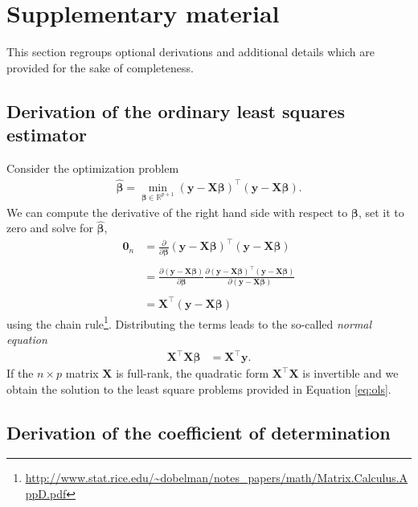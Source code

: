 \documentclass[
  11pt,
  letterpaper,
]{book}
\renewcommand{\href}[2]{#2\footnote{\url{#1}}}
\theoremstyle{definition}
\theoremstyle{definition}
\theoremstyle{definition}
\theoremstyle{definition}
\theoremstyle{remark}
\begin{document}
\hypertarget{math}{%
\chapter{Supplementary material}\label{math}}

This section regroups optional derivations and additional details which are provided for the sake of completeness.

\hypertarget{ols}{%
\section{Derivation of the ordinary least squares estimator}\label{ols}}

Consider the optimization problem
\begin{align*}
\widehat{\boldsymbol{\beta}}=\min_{\boldsymbol{\beta} \in \mathbb{R}^{p+1}}(\boldsymbol{y}-\mathbf{X}\boldsymbol{\beta})^\top(\boldsymbol{y}-\mathbf{X}\boldsymbol{\beta}).
\end{align*}
We can compute the derivative of the right hand side with respect to \(\boldsymbol{\beta}\), set it to zero and solve for \(\widehat{\boldsymbol{\beta}}\),
\begin{align*}
\mathbf{0}_n&=\frac{\partial}{\partial\boldsymbol{\beta}}(\boldsymbol{y}-\mathbf{X}\boldsymbol{\beta})^\top(\boldsymbol{y}-\mathbf{X}\boldsymbol{\beta})\\
\\&=\frac{\partial (\boldsymbol{y}-\mathbf{X}\boldsymbol{\beta})}{\partial \boldsymbol{\beta}}\frac{\partial (\boldsymbol{y}-\mathbf{X}\boldsymbol{\beta})^\top(\boldsymbol{y}-\mathbf{X}\boldsymbol{\beta})}{\partial (\boldsymbol{y}-\mathbf{X}\boldsymbol{\beta})}\\
 \\&=\mathbf{X}^\top (\boldsymbol{y}-\mathbf{X}\boldsymbol{\beta})
\end{align*}
using the \href{http://www.stat.rice.edu/~dobelman/notes_papers/math/Matrix.Calculus.AppD.pdf}{chain rule}. Distributing the terms leads to the so-called \emph{normal equation}
\begin{align*}
 \mathbf{X}^\top \mathbf{X}\boldsymbol{\beta}&=\mathbf{X}^\top \boldsymbol{y}.
\end{align*}
If the \(n \times p\) matrix \(\mathbf{X}\) is full-rank, the quadratic form \(\mathbf{X}^\top \mathbf{X}\) is invertible and we obtain the solution to the least square problems provided in Equation \eqref{eq:ols}.

\hypertarget{derivationR2}{%
\section{Derivation of the coefficient of determination}\label{derivationR2}}
\end{document}
